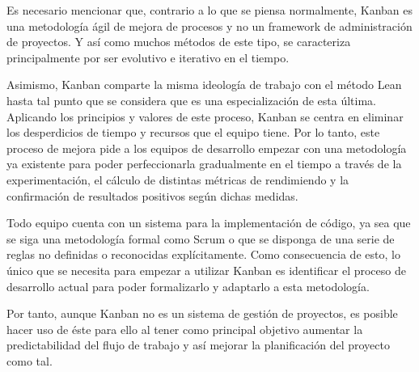 Es necesario mencionar que, contrario a lo que se piensa normalmente, Kanban es
una metodología ágil de mejora de procesos y no un framework de administración
de proyectos. Y así como muchos métodos de este tipo, se caracteriza
principalmente por ser evolutivo e iterativo en el tiempo.

Asimismo, Kanban comparte la misma ideología de trabajo con el método Lean hasta
tal punto que se considera que es una especialización de esta última. Aplicando
los principios y valores de este proceso, Kanban se centra en eliminar los
desperdicios de tiempo y recursos que el equipo tiene. Por lo tanto, este
proceso de mejora pide a los equipos de desarrollo empezar con una metodología
ya existente para poder perfeccionarla gradualmente en el tiempo a través de la
experimentación, el cálculo de distintas métricas de rendimiendo y la
confirmación de resultados positivos según dichas medidas.

Todo equipo cuenta con un sistema para la implementación de código, ya sea que
se siga una metodología formal como Scrum o que se disponga de una serie de
reglas no definidas o reconocidas explícitamente. Como consecuencia de esto, lo
único que se necesita para empezar a utilizar Kanban es identificar el proceso
de desarrollo actual para poder formalizarlo y adaptarlo a esta metodología.

Por tanto, aunque Kanban no es un sistema de gestión de proyectos, es posible
hacer uso de éste para ello al tener como principal objetivo aumentar la
predictabilidad del flujo de trabajo y así mejorar la planificación del proyecto
como tal.

